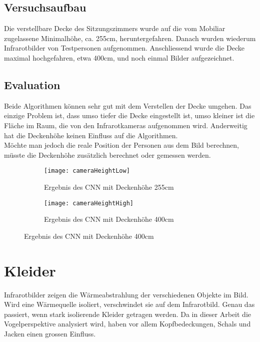 \subsection{Versuchsaufbau}

Die verstellbare Decke des Sitzungszimmers wurde auf die vom Mobiliar zugelassene Minimalhöhe, ca. 255cm, heruntergefahren. Danach wurden wiederum Infrarotbilder von Testpersonen aufgenommen. Anschliessend wurde die Decke maximal hochgefahren, etwa 400cm, und noch einmal Bilder aufgezeichnet.


\subsection{Evaluation}
Beide Algorithmen können sehr gut mit dem Verstellen der Decke umgehen. Das einzige Problem ist, dass umso tiefer die Decke eingestellt ist, umso kleiner ist die Fläche im Raum, die von den Infrarotkameras aufgenommen wird. Anderweitig hat die Deckenhöhe keinen Einfluss auf die Algorithmen.\\
Möchte man jedoch die reale Position der Personen aus dem Bild berechnen, müsste die Deckenhöhe zusätzlich berechnet oder gemessen werden.

\begin{figure}[H]
	\begin{subfigure}{.45\linewidth}
		\centering
		\texttt{[image: cameraHeightLow]}
		\caption{Ergebnis des \gls{CNN} mit Deckenhöhe 255cm}
		\label{fig:cameraHeightLow}
	\end{subfigure}
	\begin{subfigure}{.45\linewidth}
		\centering
		\texttt{[image: cameraHeightHigh]}
		\caption{Ergebnis des \gls{CNN} mit Deckenhöhe 400cm}
		\label{fig:cameraHeightHigh}
	\end{subfigure}
\end{figure}


\section{Kleider}
\label{sec:cloths}

Infrarotbilder zeigen die Wärmeabstrahlung der verschiedenen Objekte im Bild. Wird eine Wärmequelle isoliert, verschwindet sie auf dem Infrarotbild. Genau das passiert, wenn stark isolierende Kleider getragen werden. Da in dieser Arbeit die Vogelperspektive analysiert wird, haben vor allem Kopfbedeckungen, Schals und Jacken einen grossen Einfluss. 

